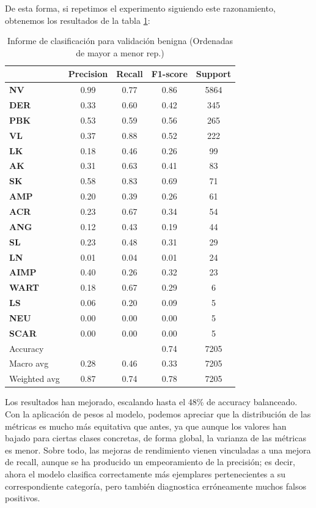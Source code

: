 De esta forma, si repetimos el experimento siguiendo este razonamiento, obtenemos los resultados de la tabla \ref{tab:benignomalmejormetrics}:


\begin{table}[!ht]
	\centering
	\begin{tabular}{|l|c|c|c|c|}
		\hline
		& Precision & Recall & F1-score & Support \\
		\hline
	\textbf{NV} & 0.99 & 0.77 & 0.86 & 5864 \\ \hline
	\textbf{DER} & 0.33 & 0.60 & 0.42 & 345 \\ \hline
	\textbf{PBK} & 0.53 & 0.59 & 0.56 & 265 \\ \hline
	\textbf{VL} & 0.37 & 0.88 & 0.52 & 222 \\ \hline
	\textbf{LK} & 0.18 & 0.46 & 0.26 & 99 \\ \hline
	\textbf{AK} & 0.31 & 0.63 & 0.41 & 83 \\ \hline
	\textbf{SK} & 0.58 & 0.83 & 0.69 & 71 \\ \hline
	\textbf{AMP} & 0.20 & 0.39 & 0.26 & 61 \\ \hline
	\textbf{ACR} & 0.23 & 0.67 & 0.34 & 54 \\ \hline
	\textbf{ANG} & 0.12 & 0.43 & 0.19 & 44 \\ \hline
	\textbf{SL} & 0.23 & 0.48 & 0.31 & 29 \\ \hline
	\textbf{LN} & 0.01 & 0.04 & 0.01 & 24 \\ \hline
	\textbf{AIMP} & 0.40 & 0.26 & 0.32 & 23 \\ \hline
	\textbf{WART} & 0.18 & 0.67 & 0.29 & 6 \\ \hline
	\textbf{LS} & 0.06 & 0.20 & 0.09 & 5 \\ \hline
	\textbf{NEU} & 0.00 & 0.00 & 0.00 & 5 \\ \hline
	\textbf{SCAR} & 0.00 & 0.00 & 0.00 & 5 \\ \hline
		\hline
		Accuracy &  &  & 0.74 & 7205 \\
		Macro avg & 0.28& 0.46& 0.33&7205\\
		Weighted avg&0.87&0.74&0.78&7205\\
		\hline
	\end{tabular}
	\caption{Informe de clasificación para validación benigna (Ordenadas de mayor a menor rep.)}
	\label{tab:benignomalmejormetrics}
\end{table}

Los resultados han mejorado, escalando hasta el 48\% de accuracy balanceado. Con la aplicación de pesos al modelo, podemos apreciar que la distribución de las métricas es mucho  más equitativa que antes, ya que aunque los valores han bajado para ciertas clases concretas, de forma global, la varianza de las métricas es menor. Sobre todo, las mejoras de rendimiento vienen vinculadas a una mejora de recall, aunque se ha producido un empeoramiento de la precisión; es decir, ahora el modelo clasifica correctamente más ejemplares pertenecientes a su correspondiente categoría, pero también diagnostica erróneamente muchos falsos positivos.

